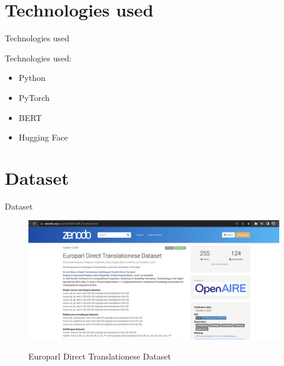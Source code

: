 \documentclass[
]{beamer}
\begin{document}
\section[Technologies used]{Technologies used}

\begin{frame}{Technologies used}

Technologies used:
\begin{itemize}
    \item Python
    \item PyTorch
    \item BERT
    \item Hugging Face
\end{itemize}

\end{frame}










\section[Dataset]{Dataset}

\begin{frame}{Dataset}

\begin{center}
    \begin{figure}[!h]
        \centering
        \includegraphics[width=\textwidth]{img/dataset-zenodo.png}
        \label{fig:dataset1}
        \caption{Europarl Direct Translationese Dataset}
    \end{figure}
\end{center}

\end{frame}
\end{document}
